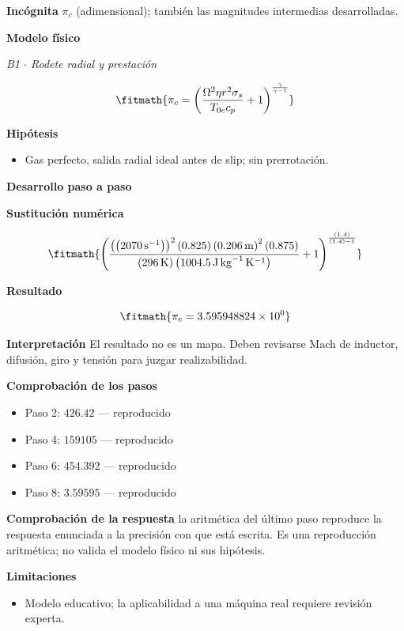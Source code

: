 \documentclass[10pt,openany]{book}
\begin{document}
\noindent\textbf{Incógnita}
$\pi_c$ (adimensional); también las magnitudes intermedias desarrolladas.

\noindent\textbf{Modelo físico}

\noindent\textit{B1 \(\cdot\) Rodete radial y prestación}

\[
\fitmath{\pi_c=\left(\frac{\Omega^{2} \eta r^{2} \sigma_s}{T_{0e} c_p} + 1\right)^{\frac{\gamma}{\gamma - 1}}}
\]

\noindent\textbf{Hipótesis}
\begin{itemize}
\item Gas perfecto, salida radial ideal antes de slip; sin prerrotación.
\end{itemize}

\noindent\textbf{Desarrollo paso a paso}



\noindent\textbf{Sustitución numérica}

\[
\fitmath{\left(\frac{\left(\left(2070\,\mathrm{s}^{-1}\right)\right)^{2} \left(0.825\right) \left(0.206\,\mathrm{m}\right)^{2} \left(0.875\right)}{\left(296\,\mathrm{K}\right) \left(1004.5\,\mathrm{J}\,\mathrm{kg}^{-1}\,\mathrm{K}^{-1}\right)} + 1\right)^{\frac{\left(1.4\right)}{\left(1.4\right) - 1}}}
\]

\noindent\textbf{Resultado}

\[
\fitmath{\pi_c=3.595948824\times10^{0}}
\]

\noindent\textbf{Interpretación}
El resultado no es un mapa. Deben revisarse Mach de inductor, difusión, giro y tensión para juzgar realizabilidad.

\noindent\textbf{Comprobación de los pasos}
\begin{itemize}
\item Paso 2: $426.42$ — reproducido
\item Paso 4: $159105$ — reproducido
\item Paso 6: $454.392$ — reproducido
\item Paso 8: $3.59595$ — reproducido
\end{itemize}

\noindent\textbf{Comprobación de la respuesta} la aritmética del último paso reproduce la respuesta enunciada a la precisión con que está escrita. Es una reproducción aritmética; no valida el modelo físico ni sus hipótesis.

\noindent\textbf{Limitaciones}
\begin{itemize}
\item Modelo educativo; la aplicabilidad a una máquina real requiere revisión experta.
\end{itemize}
\end{document}
